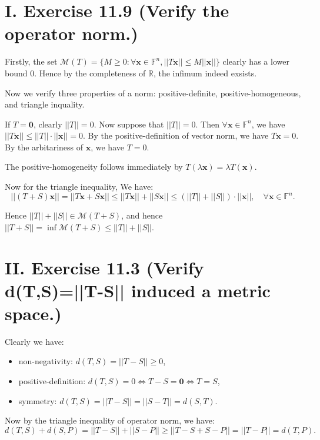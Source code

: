\documentclass[twoside,a4paper]{article}
\begin{document}
\pagestyle{fancy}
\fancyhead{}


\section*{I. Exercise 11.9 (Verify the operator norm.)}

\;\;\;\; Firstly, the set $\mathcal{M}(T)=\{M\geq 0:\forall \mathbf{x}\in \mathbb{F}^n, ||T\mathbf{x}||\leq M||\mathbf{x}||\}$ clearly has a lower bound $0$. Hence by the completeness of $\mathbb{R}$, the infimum indeed exsists.

Now we verify three properties of a norm: positive-definite, positive-homogeneous, and triangle inquality.

If $T=\mathbf{0}$, clearly $||T||=0$. Now suppose that $||T||=0$. Then $\forall \mathbf{x}\in\mathbb{F}^n$, we have $||T\mathbf{x}||\leq ||T||\cdot||\mathbf{x}||=0$. By the positive-definition of vector norm, we have $T\mathbf{x}=0$. By the arbitariness of $\mathbf{x}$, we have $T=0$.

The positive-homogeneity follows immediately by $T(\lambda\mathbf{x})=\lambda T(\mathbf{x})$.

Now for the triangle inequality, We have:
\begin{equation*}
    ||(T+S)\mathbf{x}||=||T\mathbf{x}+S\mathbf{x}||\leq ||T\mathbf{x}||+||S\mathbf{x}|| \leq (||T||+||S||)\cdot ||\mathbf{x}||,\quad \forall\mathbf{x}\in\mathbb{F}^n.
\end{equation*}

Hence $||T||+||S||\in\mathcal{M}(T+S)$, and hence $||T+S||=\inf \mathcal{M}(T+S)\leq ||T||+||S||$.

\section*{II. Exercise 11.3 (Verify d(T,S)=||T-S|| induced a metric space.)}

\;\;\;\; Clearly we have:
\begin{itemize}
    \item non-negativity: $d(T,S)=||T-S||\geq 0$,
    \item positive-definition: $d(T,S)=0 \iff T-S=\mathbf{0} \iff T=S$,
    \item symmetry: $d(T,S)=||T-S||=||S-T||=d(S,T)$.
\end{itemize}

Now by the triangle inequality of operator norm, we have:
\begin{equation*}
    d(T,S)+d(S,P) = ||T-S|| + ||S-P|| \geq ||T-S+S-P||=||T-P||=d(T,P).
\end{equation*}
\end{document}
